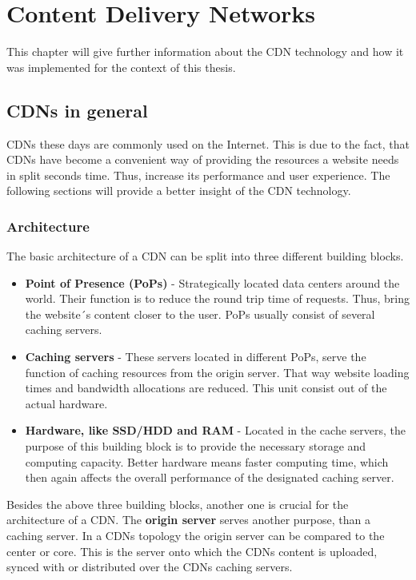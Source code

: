 \chapter{Content Delivery Networks} %
\label{Chapter3}


This chapter will give further information about the CDN technology and how it was implemented for the context of this thesis.

\section{CDNs in general}

CDNs these days are commonly used on the Internet. This is due to the fact, that CDNs have become a convenient way of providing the resources a website needs in split seconds time. Thus, increase its performance and user experience. \cite{cdn_general}
The following sections will provide a better insight of the CDN technology.

\subsection{Architecture}

The basic architecture of a CDN can be split into three different building blocks.

\begin{itemize}
	\item \textbf{Point of Presence (PoPs)} - Strategically located data centers around the world. Their function is to reduce the round trip time of requests. Thus, bring the website´s content closer to the user. PoPs usually consist of several caching servers.
	\item \textbf{Caching servers} - These servers located in different PoPs, serve the function of caching resources from the origin server. That way website loading times and bandwidth allocations are reduced. This unit consist out of the actual hardware.
	\item \textbf{Hardware, like SSD/HDD and RAM} - Located in the cache servers, the purpose of this building block is to provide the necessary storage and computing capacity. Better hardware means faster computing time, which then again affects the overall performance of the designated caching server.
\end{itemize}

Besides the above three building blocks, another one is crucial for the architecture of a CDN. The \textbf{origin server} serves another purpose, than a caching server. In a CDNs topology the origin server can be compared to the center or core. This is the server onto which the CDNs content is uploaded, synced with or distributed over the CDNs caching servers.\cite{cdn_origin_server}

